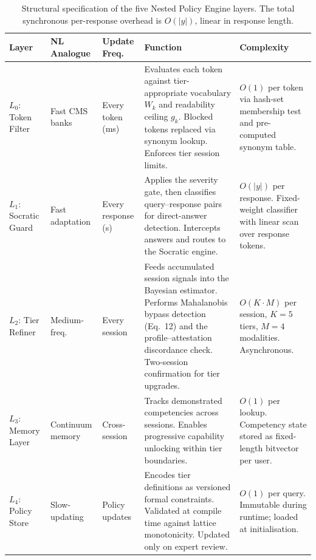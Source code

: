 \documentclass[fleqn,10pt]{wlscirep}
\begin{document}
\begin{table}[H]
\centering
\caption{Structural specification of the five Nested Policy Engine layers. The total synchronous per-response overhead is $O(|y|)$, linear in response length.}
\label{tab:layers}
\small
\begin{tabular}{p{2cm}p{1.5cm}p{1.5cm}p{4cm}p{3.5cm}}
\hline
\textbf{Layer} & \textbf{NL Analogue} & \textbf{Update Freq.} & \textbf{Function} & \textbf{Complexity} \\
\hline
$L_0$: Token Filter & Fast CMS banks & Every token (ms) & Evaluates each token against tier-appropriate vocabulary $W_k$ and readability ceiling $g_k$. Blocked tokens replaced via synonym lookup. Enforces tier session limits. & $O(1)$ per token via hash-set membership test and pre-computed synonym table. \\
\hline
$L_1$: Socratic Guard & Fast adaptation & Every response (s) & Applies the severity gate, then classifies query--response pairs for direct-answer detection. Intercepts answers and routes to the Socratic engine. & $O(|y|)$ per response. Fixed-weight classifier with linear scan over response tokens. \\
\hline
$L_2$: Tier Refiner & Medium-freq. & Every session & Feeds accumulated session signals into the Bayesian estimator. Performs Mahalanobis bypass detection (Eq.\ 12) and the profile--attestation discordance check. Two-session confirmation for tier upgrades. & $O(K \cdot M)$ per session, $K = 5$ tiers, $M = 4$ modalities. Asynchronous. \\
\hline
$L_3$: Memory Layer & Continuum memory & Cross-session & Tracks demonstrated competencies across sessions. Enables progressive capability unlocking within tier boundaries. & $O(1)$ per lookup. Competency state stored as fixed-length bitvector per user. \\
\hline
$L_4$: Policy Store & Slow-updating & Policy updates & Encodes tier definitions as versioned formal constraints. Validated at compile time against lattice monotonicity. Updated only on expert review. & $O(1)$ per query. Immutable during runtime; loaded at initialisation. \\
\hline
\end{tabular}
\end{table}
\end{document}
